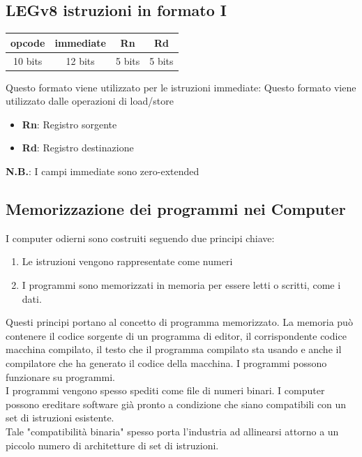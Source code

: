 \documentclass[12pt,a4paper]{article}
\begin{document}
\subsection{LEGv8 istruzioni in formato I}
\Sep
\begin{center}\begin{tabular}{cccc}
\hline
\multicolumn{1}{|c|}{opcode} & \multicolumn{1}{c|}{immediate} & \multicolumn{1}{c|}{Rn} & \multicolumn{1}{c|}{Rd} \\ \hline
10 bits & 12 bits & 5 bits & 5 bits                     
\end{tabular}\end{center}
Questo formato viene utilizzato per le istruzioni immediate:
Questo formato viene utilizzato dalle operazioni di load/store
\begin{itemize}
\item \textbf{Rn}: Registro sorgente
\item \textbf{Rd}: Registro destinazione
\end{itemize}
\textbf{N.B.}: I campi immediate sono zero-extended

\subsection{Memorizzazione dei programmi nei Computer}
I computer odierni sono costruiti seguendo due principi chiave:
\begin{enumerate}
\item Le istruzioni vengono rappresentate come numeri
\item I programmi sono memorizzati in memoria per essere letti o scritti, come i dati.
\end{enumerate}
Questi principi portano al concetto di programma memorizzato. La memoria può contenere il codice sorgente di un programma di editor, il corrispondente codice macchina compilato, il testo che il programma compilato sta usando e anche il compilatore che ha generato il codice della macchina. I programmi possono funzionare su programmi.\\
I programmi vengono spesso spediti come file di numeri binari. I computer possono ereditare software già pronto a condizione che siano compatibili con un set di istruzioni esistente.\\
Tale "compatibilità binaria" spesso porta l'industria ad allinearsi attorno a un piccolo numero di architetture di set di istruzioni.
\end{document}

